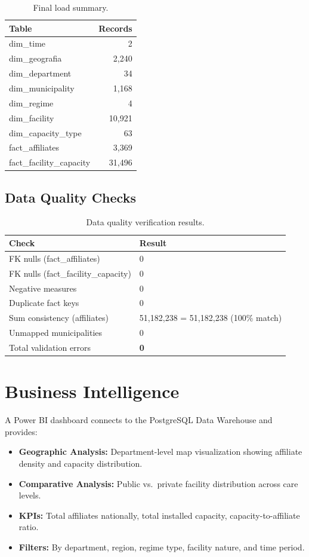 \documentclass[12pt,a4paper]{article}
\begin{document}
\begin{table}[H]
\centering
\begin{tabular}{lr}
\toprule
\textbf{Table} & \textbf{Records}\\
\midrule
dim\_time & 2\\
dim\_geografia & 2,240\\
dim\_department & 34\\
dim\_municipality & 1,168\\
dim\_regime & 4\\
dim\_facility & 10,921\\
dim\_capacity\_type & 63\\
fact\_affiliates & 3,369\\
fact\_facility\_capacity & 31,496\\
\bottomrule
\end{tabular}
\caption{Final load summary.}
\end{table}

\subsection{Data Quality Checks}

\begin{table}[H]
\centering
\begin{tabular}{ll}
\toprule
\textbf{Check} & \textbf{Result}\\
\midrule
FK nulls (fact\_affiliates) & 0\\
FK nulls (fact\_facility\_capacity) & 0\\
Negative measures & 0\\
Duplicate fact keys & 0\\
Sum consistency (affiliates) & 51,182,238 = 51,182,238 (100\% match)\\
Unmapped municipalities & 0\\
Total validation errors & \textbf{0}\\
\bottomrule
\end{tabular}
\caption{Data quality verification results.}
\end{table}

\section{Business Intelligence}

A Power BI dashboard connects to the PostgreSQL Data Warehouse and provides:

\begin{itemize}[nosep]
    \item \textbf{Geographic Analysis:} Department-level map visualization showing affiliate density and capacity distribution.
    \item \textbf{Comparative Analysis:} Public vs.\ private facility distribution across care levels.
    \item \textbf{KPIs:} Total affiliates nationally, total installed capacity, capacity-to-affiliate ratio.
    \item \textbf{Filters:} By department, region, regime type, facility nature, and time period.
\end{itemize}
\end{document}
